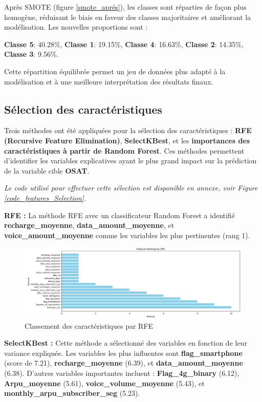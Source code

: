 Après SMOTE (figure \ref{smote_aprés}), les classes sont réparties de façon plus homogène, réduisant le biais en faveur des classes majoritaires et améliorant la modélisation. Les nouvelles proportions sont :

\textbf{Classe 5}: 40.28\%, \textbf{Classe 1}: 19.15\%, \textbf{Classe 4}: 16.63\%, \textbf{Classe 2}: 14.35\%, \textbf{Classe 3}: 9.56\%.

Cette répartition équilibrée permet un jeu de données plus adapté à la modélisation et à une meilleure interprétation des résultats finaux.

\subsection{Sélection des caractéristiques}
Trois méthodes ont été appliquées pour la sélection des caractéristiques : \textbf{RFE (Recursive Feature Elimination)}, \textbf{SelectKBest}, et les \textbf{importances des caractéristiques à partir de Random Forest}. Ces méthodes permettent d'identifier les variables explicatives ayant le plus grand impact sur la prédiction de la variable cible \textbf{OSAT}. 

\textit{Le code utilisé pour effectuer cette sélection est disponible en annexe, voir Figure \ref{code_features_Selection}.}

\textbf{RFE :} La méthode RFE avec un classificateur Random Forest a identifié \textbf{recharge\_moyenne}, \textbf{data\_amount\_moyenne}, et \textbf{voice\_amount\_moyenne} comme les variables les plus pertinentes (rang 1). 

\begin{figure}[H]
    \centering
    \includegraphics[width=1\linewidth]{capture_sas_65.png}
    \caption{Classement des caractéristiques par RFE}
\end{figure}

\textbf{SelectKBest :} Cette méthode a sélectionné des variables en fonction de leur variance expliquée. Les variables les plus influentes sont \textbf{flag\_smartphone} (score de 7.21), \textbf{recharge\_moyenne} (6.39), et \textbf{data\_amount\_moyenne} (6.38). D'autres variables importantes incluent :
\textbf{Flag\_4g\_binary} (6.12), \textbf{Arpu\_moyenne} (5.61), \textbf{voice\_volume\_moyenne} (5.43), et \textbf{monthly\_arpu\_subscriber\_seg} (5.23).

